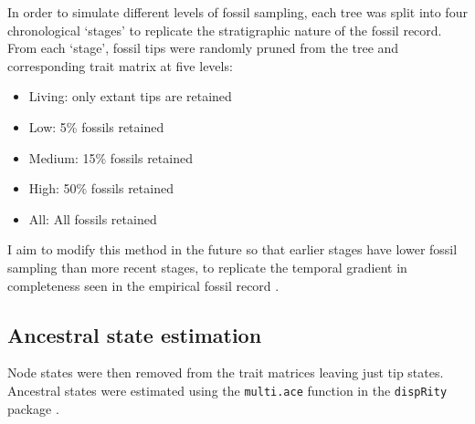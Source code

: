 \documentclass[titlepage]{article}
\begin{document}
In order to simulate different levels of fossil sampling, each tree was split into four chronological `stages' to replicate the stratigraphic nature of the fossil record.
From each `stage', fossil tips were randomly pruned from the tree and corresponding trait matrix at five levels:
\begin{itemize}
    \item Living: only extant tips are retained
    \item Low: 5\% fossils retained
    \item Medium: 15\% fossils retained
    \item High: 50\% fossils retained
    \item All: All fossils retained
\end{itemize}
I aim to modify this method in the future so that earlier stages have lower fossil sampling than more recent stages, to replicate the temporal gradient in completeness seen in the empirical fossil record \citep{davies2017completeness}.

\subsection{Ancestral state estimation}
Node states were then removed from the trait matrices leaving just tip states.
Ancestral states were estimated using the \texttt{multi.ace} function in the \texttt{dispRity} package \citep{guillerme2018disprity}.
\end{document}
